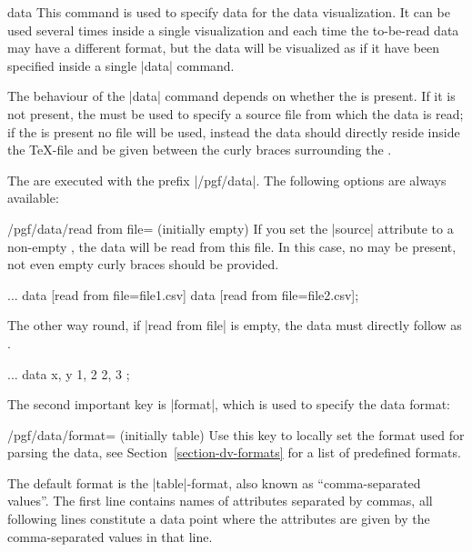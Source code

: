 \begin{datavisualizationoperation}{data}{}
    This command is used to specify data for the data visualization. It can be
    used several times inside a single visualization and each time the
    to-be-read data may have a different format, but the data will be
    visualized as if it have been specified inside a single |data| command.

    The behaviour of the |data| command depends on whether the  is present. If it is not present, the  must be used to
    specify a source file from which the data is read; if the  is present no file will be used, instead the data should directly
    reside inside the \TeX-file and be given between the curly braces
    surrounding the .

    The  are executed with the prefix |/pgf/data|. The following
    options are always available:
    \begin{key}{/pgf/data/read from file= (initially \normalfont empty)}
        If you set the |source| attribute to a non-empty , the
        data will be read from this file. In this case, no 
        may be present, not even empty curly braces should be provided.
\begin{codeexample}
\datavisualization ...
  data [read from file=file1.csv]
  data [read from file=file2.csv];
\end{codeexample}
        The other way round, if |read from file| is empty, the  data must
        directly follow as .
\begin{codeexample}
\datavisualization ...
  data {
    x, y
    1, 2
    2, 3
  };
\end{codeexample}
    \end{key}
    The second important key is |format|, which is used to specify the data
    format:
    \begin{key}{/pgf/data/format= (initially table)}
        Use this key to locally set the format used for parsing the data, see
        Section~\ref{section-dv-formats} for a list of predefined formats.

        The default format is the |table|-format, also known as
        ``comma-separated values''. The first line contains names of attributes
        separated by commas, all following lines constitute a data point where
        the attributes are given by the comma-separated values in that line.
    \end{key}



\end{datavisualizationoperation}
